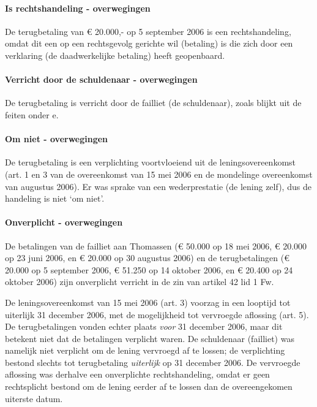 \documentclass[
  dutch,
  a4paper,
]{article}
\begin{document}
\paragraph{Is rechtshandeling - overwegingen}\label{is-rechtshandeling---overwegingen-75}

De terugbetaling van € 20.000,- op 5 september 2006 is een rechtshandeling, omdat dit een op een rechtsgevolg gerichte wil (betaling) is die zich door een verklaring (de daadwerkelijke betaling) heeft geopenbaard.

\paragraph{Verricht door de schuldenaar - overwegingen}\label{verricht-door-de-schuldenaar---overwegingen-75}

De terugbetaling is verricht door de failliet (de schuldenaar), zoals blijkt uit de feiten onder e.

\paragraph{Om niet - overwegingen}\label{om-niet---overwegingen-75}

De terugbetaling is een verplichting voortvloeiend uit de leningsovereenkomst (art. 1 en 3 van de overeenkomst van 15 mei 2006 en de mondelinge overeenkomst van augustus 2006). Er was sprake van een wederprestatie (de lening zelf), dus de handeling is niet `om niet'.

\paragraph{Onverplicht - overwegingen}\label{onverplicht---overwegingen-75}

De betalingen van de failliet aan Thomassen (€ 50.000 op 18 mei 2006, € 20.000 op 23 juni 2006, en € 20.000 op 30 augustus 2006) en de terugbetalingen (€ 20.000 op 5 september 2006, € 51.250 op 14 oktober 2006, en € 20.400 op 24 oktober 2006) zijn onverplicht verricht in de zin van artikel 42 lid 1 Fw.

De leningsovereenkomst van 15 mei 2006 (art. 3) voorzag in een looptijd tot uiterlijk 31 december 2006, met de mogelijkheid tot vervroegde aflossing (art. 5). De terugbetalingen vonden echter plaats \emph{voor} 31 december 2006, maar dit betekent niet dat de betalingen verplicht waren. De schuldenaar (failliet) was namelijk niet verplicht om de lening vervroegd af te lossen; de verplichting bestond slechts tot terugbetaling \emph{uiterlijk} op 31 december 2006. De vervroegde aflossing was derhalve een onverplichte rechtshandeling, omdat er geen rechtsplicht bestond om de lening eerder af te lossen dan de overeengekomen uiterste datum.
\end{document}
